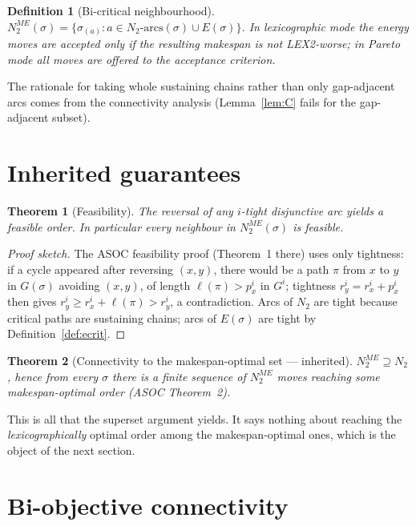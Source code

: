 \documentclass[11pt,a4paper]{article}
\newtheorem{theorem}{Theorem}
\newtheorem{definition}{Definition}
\begin{document}
\begin{definition}[Bi-critical neighbourhood]\label{def:n2me}
$N_2^{ME}(\sigma)=\{\sigma_{(a)} : a\in N_2\text{-arcs}(\sigma)\cup
E(\sigma)\}$. In \emph{lexicographic mode} the energy moves are accepted
only if the resulting makespan is not LEX2-worse; in \emph{Pareto mode}
all moves are offered to the acceptance criterion.
\end{definition}

The rationale for taking whole sustaining chains rather than only
gap-adjacent arcs comes from the connectivity analysis (Lemma~\ref{lem:C}
fails for the gap-adjacent subset).

\section{Inherited guarantees}

\begin{theorem}[Feasibility]\label{thm:feas}
The reversal of any $i$-tight disjunctive arc yields a feasible order.
In particular every neighbour in $N_2^{ME}(\sigma)$ is feasible.
\end{theorem}

\begin{proof}[Proof sketch]
The ASOC feasibility proof (Theorem~1 there) uses only tightness: if a
cycle appeared after reversing $(x,y)$, there would be a path $\pi$ from
$x$ to $y$ in $G(\sigma)$ avoiding $(x,y)$, of length
$\ell(\pi)>p^i_x$ in $G^i$; tightness $r^i_y=r^i_x+p^i_x$ then gives
$r^i_y\ge r^i_x+\ell(\pi)>r^i_y$, a contradiction. Arcs of $N_2$ are tight
because critical paths are sustaining chains; arcs of $E(\sigma)$ are tight
by Definition~\ref{def:ecrit}.
\end{proof}

\begin{theorem}[Connectivity to the makespan-optimal set — inherited]
\label{thm:inherited}
$N_2^{ME}\supseteq N_2$, hence from every $\sigma$ there is a finite
sequence of $N_2^{ME}$ moves reaching some makespan-optimal order
(ASOC Theorem~2).
\end{theorem}

This is all that the superset argument yields. It says nothing about
reaching the \emph{lexicographically} optimal order among the
makespan-optimal ones, which is the object of the next section.

\section{Bi-objective connectivity}
\end{document}
